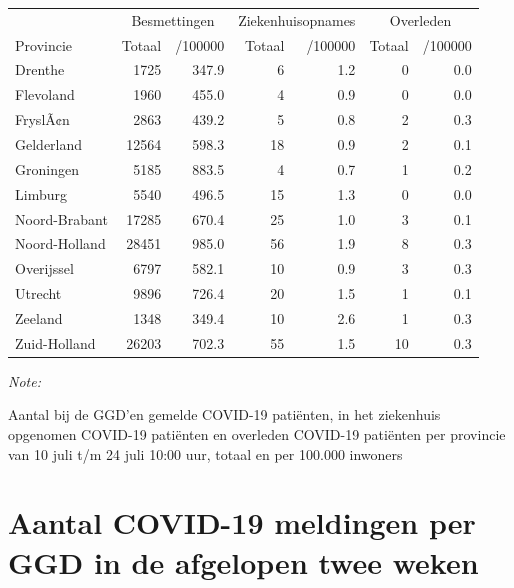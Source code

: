 \documentclass[
  english,
  man,floatsintext]{apa6}
\begin{document}
\begin{table}
\centering
\begin{threeparttable}
\begin{tabular}{lrrrrrr}
\toprule
\multicolumn{1}{c}{ } & \multicolumn{2}{c}{Besmettingen} & \multicolumn{2}{c}{Ziekenhuisopnames} & \multicolumn{2}{c}{Overleden} \\
\cmidrule(l{3pt}r{3pt}){2-3} \cmidrule(l{3pt}r{3pt}){4-5} \cmidrule(l{3pt}r{3pt}){6-7}
Provincie & Totaal & /100000 & Totaal & /100000 & Totaal & /100000\\
\midrule
Drenthe & 1725 & 347.9 & 6 & 1.2 & 0 & 0.0\\
Flevoland & 1960 & 455.0 & 4 & 0.9 & 0 & 0.0\\
FryslÃ¢n & 2863 & 439.2 & 5 & 0.8 & 2 & 0.3\\
Gelderland & 12564 & 598.3 & 18 & 0.9 & 2 & 0.1\\
Groningen & 5185 & 883.5 & 4 & 0.7 & 1 & 0.2\\
Limburg & 5540 & 496.5 & 15 & 1.3 & 0 & 0.0\\
Noord-Brabant & 17285 & 670.4 & 25 & 1.0 & 3 & 0.1\\
Noord-Holland & 28451 & 985.0 & 56 & 1.9 & 8 & 0.3\\
Overijssel & 6797 & 582.1 & 10 & 0.9 & 3 & 0.3\\
Utrecht & 9896 & 726.4 & 20 & 1.5 & 1 & 0.1\\
Zeeland & 1348 & 349.4 & 10 & 2.6 & 1 & 0.3\\
Zuid-Holland & 26203 & 702.3 & 55 & 1.5 & 10 & 0.3\\
\bottomrule
\end{tabular}
\begin{tablenotes}
\item \textit{Note: } 
\item Aantal bij de GGD’en gemelde COVID-19 patiënten, in het ziekenhuis opgenomen COVID-19 patiënten en overleden COVID-19 patiënten per provincie van 10 juli t/m 24 juli 10:00 uur, totaal en per 100.000 inwoners
\end{tablenotes}
\end{threeparttable}
\end{table}

\newpage

\hypertarget{aantal-covid-19-meldingen-per-ggd-in-de-afgelopen-twee-weken}{%
\section{Aantal COVID-19 meldingen per GGD in de afgelopen twee weken}\label{aantal-covid-19-meldingen-per-ggd-in-de-afgelopen-twee-weken}}
\end{document}
